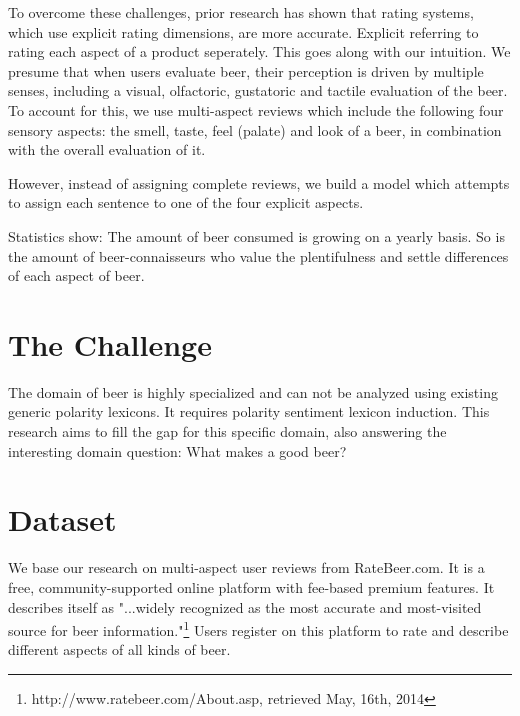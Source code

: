 \documentclass[11pt,titlepage,oneside,openany]{book}
\begin{document}
To overcome these challenges, prior research has shown that rating systems, which use explicit rating dimensions, are more accurate.%
Explicit referring to rating each aspect of a product seperately. This goes along with our intuition. We presume that when users evaluate beer, their perception is driven by multiple senses, including a visual, olfactoric, gustatoric and tactile evaluation of the beer. To account for this, we use multi-aspect reviews which include the following four sensory aspects: the smell, taste, feel (palate) and look of a beer, in combination with the overall evaluation of it. 

However, instead of assigning complete reviews, we build a model which attempts to assign each sentence to one of the four explicit aspects. 





Statistics show: The amount of beer consumed is growing on a yearly basis. So is the amount of beer-connaisseurs who value the plentifulness and settle differences of each aspect of beer. 






\section{The Challenge}


The domain of beer is highly specialized and can not be analyzed using existing generic polarity lexicons. It requires polarity sentiment lexicon induction. This research aims to fill the gap for this specific domain, also answering the interesting domain question: What makes a good beer?

\section{Dataset}

We base our research on multi-aspect user reviews from RateBeer.com. It is a free, community-supported online platform with fee-based premium features. It describes itself as "...widely recognized as the most accurate and most-visited source for beer information."\footnote{http://www.ratebeer.com/About.asp, retrieved May, 16th, 2014} Users register on this platform to rate and describe different aspects of all kinds of beer. 
\end{document}
